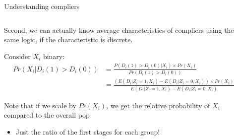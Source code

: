 \documentclass[notes,11pt, aspectratio=169]{beamer}
\newenvironment{wideitemize}{\itemize\addtolength{\itemsep}{10pt}}{\enditemize}
\begin{document}
\begin{frame}{Understanding compliers}
  \begin{columns}[T] %
    \begin{column}{0.7\textwidth}
      \begin{wideitemize}
      \item Second, we can actually know average characteristics of
        compliers using the same logic, if the characteristic is
        discrete.
      \item Consider $X_{i}$ binary:
        \begin{align*}
          Pr(X_{i} | D_{i}(1) > D_{i}(0)) &= \frac{P(D_{i}(1) > D_{i}(0) | X_{i}) \times Pr(X_{i})}{Pr(D_{i}(1) > D_{i}(0))}\\
          &= \frac{\left(E(D_{i} | Z_{i} = 1, X_{i}) - E(D_{i} | Z_{i} = 0, X_{i})\right) \times Pr(X_{i})}{E(D_{i} | Z_{i} = 1, X_{i}) - E(D_{i} | Z_{i} = 0, X_{i})}
        \end{align*}
      \item Note that if we scale by $Pr(X_{i})$, we get the relative
        probability of $X_{i}$ compared to the overall pop
        \begin{itemize}
        \item Just the ratio of the first stages for each group!
        \end{itemize}
      \end{wideitemize}
\end{column}
\begin{column}{0.3\textwidth}
\end{column}
\end{columns}

  
\end{frame}
\end{document}
